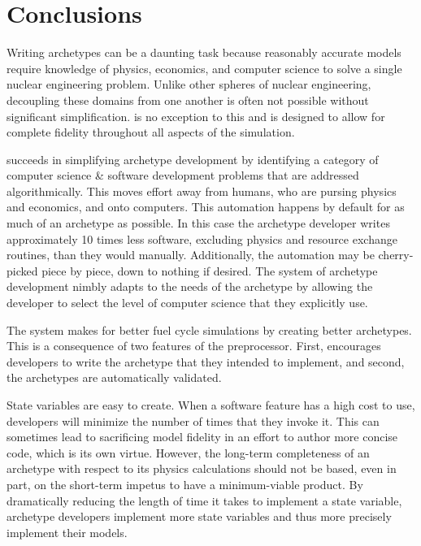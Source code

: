 \section{Conclusions}
\label{sec-conc}

Writing archetypes can be a daunting task because reasonably accurate models 
require knowledge of physics, economics, and computer science to solve a single nuclear engineering 
problem.  Unlike other spheres of nuclear engineering, decoupling these domains from
one another is often not possible without significant simplification. \cyclus is 
no exception to this and is designed to allow for complete fidelity throughout 
all aspects of the simulation. 

\Cyclus succeeds in simplifying archetype development by identifying a category 
of computer science \& software development problems that are addressed 
algorithmically. This moves effort away from humans, who are pursing physics and
economics, and onto computers. This automation happens by default for as much of
an archetype as possible. In this case the archetype developer writes approximately
10 times less software, excluding physics and resource exchange routines, than
they would manually. Additionally, the automation may be cherry-picked piece by piece,
down to nothing if desired. The \cyclus system of archetype development nimbly 
adapts to the needs of the archetype by allowing the developer to select the 
level of computer science that they explicitly use.  

The \cyclus system makes for better fuel cycle simulations by creating better 
archetypes.  This is a consequence of two features of the preprocessor. First, 
\cyclus encourages developers to write the archetype
that they intended to implement, and second, the archetypes are automatically
validated.

State variables are easy to create. When a software feature has a high cost to use,
developers will minimize the number of times that they invoke it. This can 
sometimes lead to sacrificing model fidelity in an effort to author more concise
code, which is its own virtue. However, the long-term completeness of an archetype
with respect to its physics calculations should not be based, even in part, on the
short-term impetus to have a minimum-viable product. By dramatically reducing the 
length of time it takes to implement a state variable, archetype developers implement
more state variables and thus more precisely implement their models.

